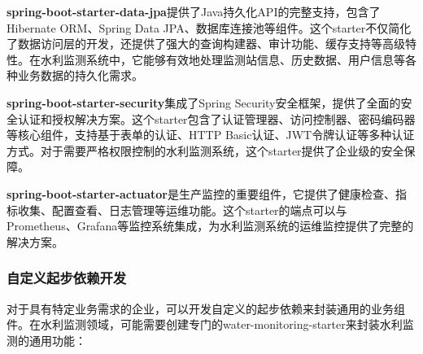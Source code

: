 \textbf{spring-boot-starter-data-jpa}提供了Java持久化API的完整支持，包含了Hibernate ORM、Spring Data JPA、数据库连接池等组件。这个starter不仅简化了数据访问层的开发，还提供了强大的查询构建器、审计功能、缓存支持等高级特性。在水利监测系统中，它能够有效地处理监测站信息、历史数据、用户信息等各种业务数据的持久化需求。

\textbf{spring-boot-starter-security}集成了Spring Security安全框架，提供了全面的安全认证和授权解决方案。这个starter包含了认证管理器、访问控制器、密码编码器等核心组件，支持基于表单的认证、HTTP Basic认证、JWT令牌认证等多种认证方式。对于需要严格权限控制的水利监测系统，这个starter提供了企业级的安全保障。

\textbf{spring-boot-starter-actuator}是生产监控的重要组件，它提供了健康检查、指标收集、配置查看、日志管理等运维功能。这个starter的端点可以与Prometheus、Grafana等监控系统集成，为水利监测系统的运维监控提供了完整的解决方案。

\subsubsection{自定义起步依赖开发}\label{ux81eaux5b9aux4e49ux8d77ux6b65ux4f9dux8d56ux5f00ux53d1}

对于具有特定业务需求的企业，可以开发自定义的起步依赖来封装通用的业务组件。在水利监测领域，可能需要创建专门的water-monitoring-starter来封装水利监测的通用功能：

